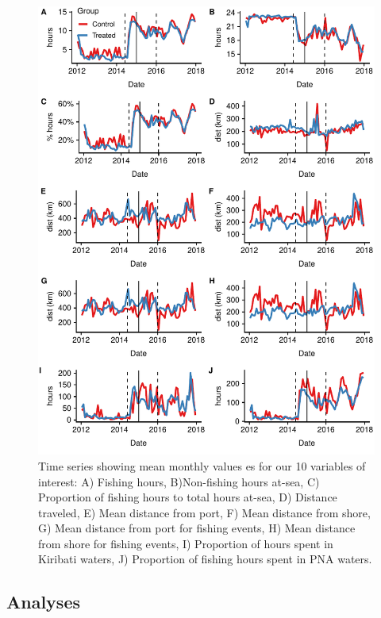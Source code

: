 \documentclass[9pt,twoside,lineno]{pnas-new}
\begin{document}


\begin{figure}
\centering
\includegraphics{img/all_panels.pdf}
\caption{\label{fig:all_panels}Time series showing mean monthly values es for our 10 variables of interest:
A) Fishing hours, B)Non-fishing hours at-sea,
C) Proportion of fishing hours to total hours at-sea,
D) Distance traveled, E) Mean distance from port,
F) Mean distance from shore,
G) Mean distance from port for fishing events,
H) Mean distance from shore for fishing events,
I) Proportion of hours spent in Kiribati waters,
J) Proportion of fishing hours spent in PNA waters.}
\end{figure}

\clearpage

\subsection{Analyses}\label{analyses}
\end{document}
